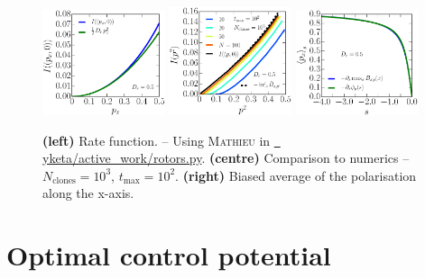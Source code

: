 \documentclass[pre,aps,superscriptaddress,nofootinbib]{revtex4}
\begin{document}
\begin{figure}[H]
\centering
\includegraphics[width=0.32\textwidth]{mathieu_rate.eps}
\includegraphics[width=0.32\textwidth]{rate_cloning.eps}
\includegraphics[width=0.32\textwidth]{polarisation_x.eps}
\caption{\textbf{(left)} Rate function. -- Using \textsc{Mathieu} in \href{https://github.com/yketa/active_work/blob/master/rotors.py}{\faGithub~ yketa/active\_work/rotors.py}. \textbf{(centre)} Comparison to numerics -- $N_{\mathrm{clones}} = 10^3$, $t_{\mathrm{max}} = 10^2$. \textbf{(right)} Biased average of the polarisation along the x-axis.}
\label{mathieu_rate_fig}
\end{figure}

\section{Optimal control potential}
\end{document}
